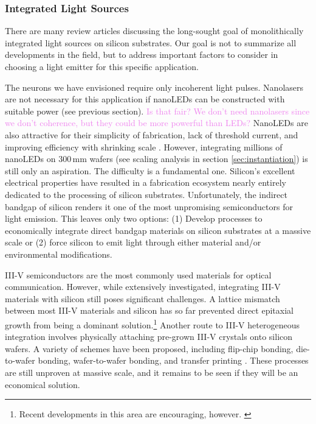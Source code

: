 \documentclass[twocolumn]{article}
\begin{document}
\subsubsection{Integrated Light Sources}
There are many review articles discussing the long-sought goal of monolithically integrated light sources on silicon substrates. Our goal is not to summarize all developments in the field, but to address important factors to consider in choosing a light emitter for this specific application.

The neurons we have envisioned require only incoherent light pulses. Nanolasers are not necessary for this application if nanoLEDs can be constructed with suitable power (see previous section). \textcolor{Violet}{Is that fair? We don't need nanolasers since we don't coherence, but they could be more powerful than LEDs?} NanoLEDs are also attractive for their simplicity of fabrication, lack of threshold current, and improving efficiency with shrinking scale \cite{romeira2019physical}. However, integrating millions of nanoLEDs on 300\,mm wafers (see scaling analysis in section \ref{sec:instantiation}) is still only an aspiration. The difficulty is a fundamental one. Silicon's excellent electrical properties have resulted in a fabrication ecosystem nearly entirely dedicated to the processing of silicon substrates. Unfortunately, the indirect bandgap of silicon renders it one of the most unpromising semiconductors for light emission. This leaves only two options: (1) Develop processes to economically integrate direct bandgap materials on silicon substrates at a massive scale or (2) force silicon to emit light through either material and/or environmental modifications.

III-V semiconductors are the most commonly used materials for optical communication. However, while extensively investigated, integrating III-V materials with silicon still poses significant challenges. A lattice mismatch between most III-V materials and silicon has so far prevented direct epitaxial growth from being a dominant solution.\footnote{Recent developments in this area are encouraging, however. \cite{li2017epitaxial}} Another route to III-V heterogeneous integration involves physically attaching pre-grown III-V crystals onto silicon wafers. A variety of schemes have been proposed, including flip-chip bonding, die-to-wafer bonding, wafer-to-wafer bonding, and transfer printing \cite{zhang2019iii}. These processes are still unproven at massive scale, and it remains to be seen if they will be an economical solution.
\end{document}
